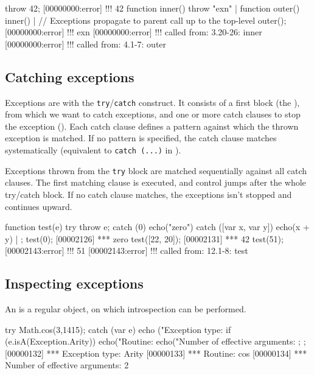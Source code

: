 \begin{urbiscript}[firstnumber=last]
throw 42;
[00000000:error] !!! 42
function inner() { throw "exn" } |
function outer() { inner() }|
// Exceptions propagate to parent call up to the top-level
outer();
[00000000:error] !!! exn
[00000000:error] !!!    called from: 3.20-26: inner
[00000000:error] !!!    called from: 4.1-7: outer
\end{urbiscript}

\subsection{Catching exceptions}

Exceptions are  with the
\lstinline|try|/\lstinline|catch| construct. It consists of a first
block (the ), from which we want to catch exceptions,
and one or more catch clauses to stop the exception
(). Each catch clause defines a pattern against
which the thrown exception is matched. If no pattern is specified, the
catch clause matches systematically (equivalent to
\lstinline|catch (...)| in \Cxx).

Exceptions thrown from the \texttt{try} block are matched sequentially
against all catch clauses. The first matching clause is executed, and
control jumps after the whole try/catch block. If no catch clause
matches, the exceptions isn't stopped and continues
upward.

\begin{urbiscript}[firstnumber=last]
function test(e)
{
  try
  { throw e;  }
  catch (0)
  { echo("zero") }
  catch ([var x, var y])
  { echo(x + y) }
} | {};
test(0);
[00002126] *** zero
test([22, 20]);
[00002131] *** 42
test(51);
[00002143:error] !!! 51
[00002143:error] !!!    called from: 12.1-8: test
\end{urbiscript}

\subsection{Inspecting exceptions}

An  is a regular object, on which introspection
can be performed.

\begin{urbiscript}[firstnumber=last]
try
{
  Math.cos(3,1415);
}
catch (var e)
{
  echo ("Exception type: %
  if (e.isA(Exception.Arity))
  {
    echo("Routine: %
    echo("Number of effective arguments: %
  };
};
[00000132] *** Exception type: Arity
[00000133] *** Routine: cos
[00000134] *** Number of effective arguments: 2
\end{urbiscript}

